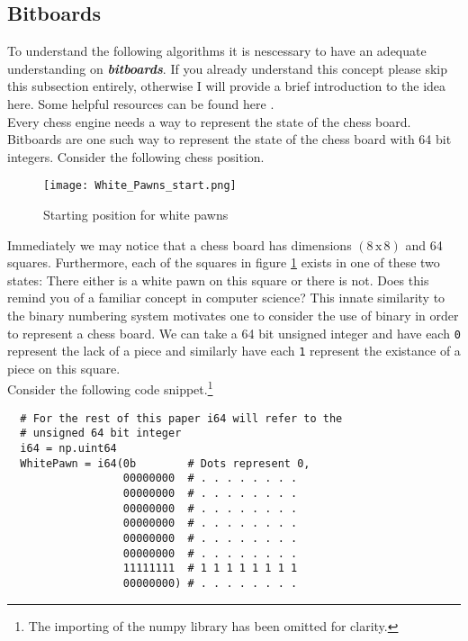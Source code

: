 \subsection*{Bitboards}
To understand the following algorithms it is nescessary to 
have an adequate understanding on \textbf{\textit{bitboards}}.
If you already understand this concept please skip this 
subsection entirely, otherwise I will provide a brief 
introduction to the idea here. Some helpful resources can be
found here \cite{bitboards}.\\

Every chess engine needs a way to represent the state of the
chess board. Bitboards are one such way to represent the
state of the chess board with 64 bit integers. Consider
the following chess position.

\begin{figure}[h]
  \texttt{[image: White\_Pawns\_start.png]}
  \centering
  \caption{Starting position for white pawns}
  \label{whitepawns}
\end{figure}

Immediately we may notice that a chess board has dimensions
$(8 \, \textrm{x} \, 8)$ and 64 squares. Furthermore, 
each of the squares in figure \ref{whitepawns} exists 
in one of these two states: There either is a white pawn on
this square or there is not. Does this remind you of a 
familiar concept in computer science? This innate similarity to 
the binary numbering system motivates one to consider the 
use of binary in order to represent a chess board. We can take a 
64 bit unsigned integer and have each \texttt{0} 
represent the lack of a piece and similarly 
have each \texttt{1} represent the existance of a piece on 
this square.\\

Consider the following code snippet.\footnote{The importing
of the numpy library has been omitted for clarity.}

\begin{verbatim}
  # For the rest of this paper i64 will refer to the 
  # unsigned 64 bit integer
  i64 = np.uint64
  WhitePawn = i64(0b        # Dots represent 0,
                  00000000  # . . . . . . . .
                  00000000  # . . . . . . . .
                  00000000  # . . . . . . . .
                  00000000  # . . . . . . . .
                  00000000  # . . . . . . . .
                  00000000  # . . . . . . . .
                  11111111  # 1 1 1 1 1 1 1 1
                  00000000) # . . . . . . . .
\end{verbatim}

